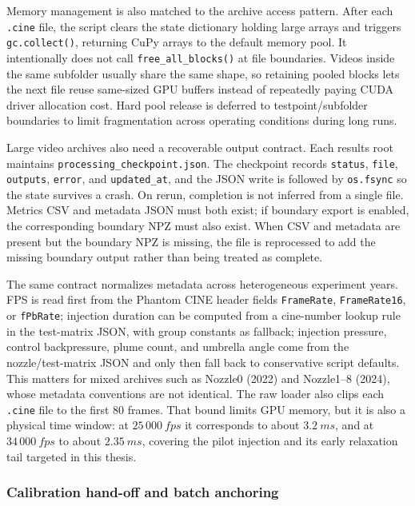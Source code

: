 \documentclass[english, 12pt, a4paper, elec, utf8, a-2b, online]{aaltothesis}
\DeclareRobustCommand{\codepath}[1]{\nolinkurl{#1}}
\begin{document}
Memory management is also matched to the archive access pattern. After each \texttt{.cine} file, the script clears the state dictionary holding large arrays and triggers \texttt{gc.collect()}, returning CuPy arrays to the default memory pool. It intentionally does not call \texttt{free\_all\_blocks()} at file boundaries. Videos inside the same subfolder usually share the same shape, so retaining pooled blocks lets the next file reuse same-sized GPU buffers instead of repeatedly paying CUDA driver allocation cost. Hard pool release is deferred to testpoint/subfolder boundaries to limit fragmentation across operating conditions during long runs.

Large video archives also need a recoverable output contract. Each results root maintains \codepath{processing_checkpoint.json}. The checkpoint records \texttt{status}, \texttt{file}, \texttt{outputs}, \texttt{error}, and \texttt{updated\_at}, and the JSON write is followed by \texttt{os.fsync} so the state survives a crash. On rerun, completion is not inferred from a single file. Metrics CSV and metadata JSON must both exist; if boundary export is enabled, the corresponding boundary NPZ must also exist. When CSV and metadata are present but the boundary NPZ is missing, the file is reprocessed to add the missing boundary output rather than being treated as complete.

The same contract normalizes metadata across heterogeneous experiment years. FPS is read first from the Phantom CINE header fields \texttt{FrameRate}, \texttt{FrameRate16}, or \texttt{fPbRate}; injection duration can be computed from a cine-number lookup rule in the test-matrix JSON, with group constants as fallback; injection pressure, control backpressure, plume count, and umbrella angle come from the nozzle/test-matrix JSON and only then fall back to conservative script defaults. This matters for mixed archives such as Nozzle0 (2022) and Nozzle1--8 (2024), whose metadata conventions are not identical. The raw loader also clips each \texttt{.cine} file to the first 80 frames. That bound limits GPU memory, but it is also a physical time window: at \(25\,000~fps\) it corresponds to about \(\SI{3.2}{ms}\), and at \(34\,000~fps\) to about \(\SI{2.35}{ms}\), covering the pilot injection and its early relaxation tail targeted in this thesis.

\subsubsection{Calibration hand-off and batch anchoring}
\end{document}
